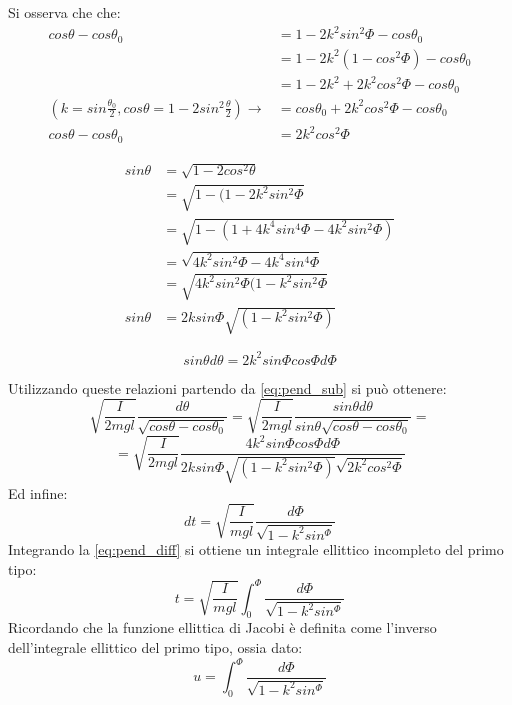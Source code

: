 Si osserva che che:
\begin{align} \nonumber
cos\theta - cos\theta_0 &=  1-2k^2sin^2\Phi - cos\theta_0  \\ \nonumber
&= 1-2k^2(1-cos^2\Phi) - cos\theta_0 \\ \nonumber
&= 1-2k^2+2k^2cos^2\Phi-cos\theta_0 \\ \nonumber
\left( k = sin\frac{\theta_0}{2}, cos\theta = 1-2sin^2\frac{\theta}{2}\right) \rightarrow &=cos\theta_0+ 2k^2cos^2\Phi - cos\theta_0 \\
cos\theta - cos\theta_0 &= 2k^2cos^2\Phi
\end{align}

\begin{align}
    sin\theta &= \sqrt{1-2cos^2\theta} \\ \nonumber
    &= \sqrt{1-(1-2k^2sin^2\Phi} \\ \nonumber
    &= \sqrt{1-(1+4k^4sin^4\Phi-4k^2sin^2\Phi)} \\ \nonumber
    &= \sqrt{4k^2sin^2\Phi - 4k^4sin^4\Phi} \\ \nonumber
    &= \sqrt{4k^2sin^2\Phi(1-k^2sin^2\Phi} \\
    sin\theta &= 2ksin\Phi\sqrt{(1-k^2sin^2\Phi)}  \
\end{align}

\begin{equation}
    sin\theta d\theta = 2k^2sin\Phi cos\Phi d\Phi
\end{equation}

Utilizzando queste relazioni partendo da \ref{eq:pend_sub} si può ottenere: 
\[\sqrt{\frac{I}{2mgl}} \frac{d\theta}{\sqrt{cos\theta - cos\theta_0}} = \sqrt{\frac{I}{2mgl}} 
\frac{sin\theta d\theta}{sin\theta\sqrt{cos\theta - cos\theta_0}} = \]
\[
= \sqrt{\frac{I}{2mgl}} \frac{4k^2sin\Phi cos\Phi d\Phi}{2ksin\Phi\sqrt{(1-k^2sin^2\Phi)} \sqrt{2k^2cos^2\Phi} } 
\]
Ed infine:
\begin{equation} \label{eq:pend_diff}
    dt = \sqrt{\frac{I}{mgl}} \frac{d\Phi}{\sqrt{1-k^2sin^\Phi}} 
\end{equation}
Integrando la \ref{eq:pend_diff} si ottiene un integrale ellittico incompleto del primo tipo:
\begin{equation} \label{eq:pend_int}
    t = \sqrt{\frac{I}{mgl}}  \int_0^\Phi \frac{d\Phi}{\sqrt{1-k^2sin^\Phi}}
\end{equation}
Ricordando che la funzione ellittica di Jacobi è definita come l'inverso dell'integrale ellittico del primo tipo, ossia dato:
\begin{equation}
    u =  \int_0^\Phi \frac{d\Phi}{\sqrt{1-k^2sin^\Phi}}
\end{equation}

